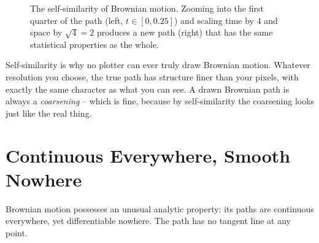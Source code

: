 \begin{whybox}
\begin{figure}[H]
\caption{The self-similarity of Brownian motion. Zooming into the first quarter
of the path (left, $t \in [0, 0.25]$) and scaling time by $4$ and space by $\sqrt{4}=2$
produces a new path (right) that has the same statistical properties as the whole.}
\label{ch29:fig-selfsimilar}
\end{figure}
\end{whybox}

\begin{aestheticbox}
Self-similarity is why no plotter can ever truly draw Brownian motion. Whatever
resolution you choose, the true path has structure finer than your pixels, with
exactly the same character as what you can see. A drawn Brownian path is always a
\emph{coarsening} -- which is fine, because by self-similarity the coarsening
looks just like the real thing.
\end{aestheticbox}

\section{Continuous Everywhere, Smooth Nowhere}
\label{ch29:nowhere-diff}

Brownian motion possesses an unusual analytic property: its paths are continuous
everywhere, yet differentiable nowhere. The path has no tangent line at any point.

